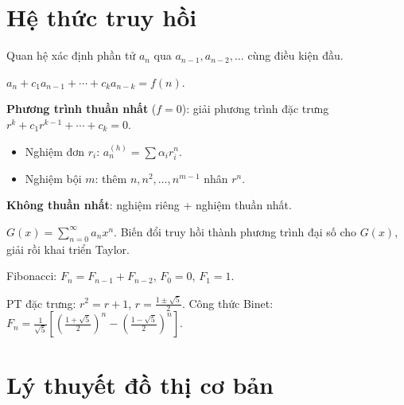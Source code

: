 \documentclass[12pt,a4paper]{article}
\begin{document}
\section{Hệ thức truy hồi}

\begin{dinhnghia}
  Quan hệ xác định phần tử $a_n$ qua $a_{n-1}, a_{n-2}, \ldots$ cùng điều kiện đầu.
\end{dinhnghia}

\begin{phuongphap}[title={Truy hồi tuyến tính hệ số hằng}]
  $a_n + c_1 a_{n-1} + \cdots + c_k a_{n-k} = f(n)$.

  \textbf{Phương trình thuần nhất} ($f = 0$): giải phương trình đặc trưng $r^k + c_1 r^{k-1} + \cdots + c_k = 0$.
  \begin{itemize}
    \item Nghiệm đơn $r_i$: $a_n^{(h)} = \sum \alpha_i r_i^n$.
    \item Nghiệm bội $m$: thêm $n, n^2, \ldots, n^{m-1}$ nhân $r^n$.
  \end{itemize}
  \textbf{Không thuần nhất}: nghiệm riêng + nghiệm thuần nhất.
\end{phuongphap}

\begin{phuongphap}[title={Hàm sinh (generating function)}]
  $G(x) = \sum_{n=0}^{\infty} a_n x^n$. Biến đổi truy hồi thành phương trình đại số cho $G(x)$, giải rồi khai triển Taylor.
\end{phuongphap}

\begin{vidu}
  Fibonacci: $F_n = F_{n-1} + F_{n-2}$, $F_0 = 0$, $F_1 = 1$.

  PT đặc trưng: $r^2 = r + 1$, $r = \frac{1 \pm \sqrt{5}}{2}$. Công thức Binet:
  $F_n = \frac{1}{\sqrt{5}}\left[\left(\frac{1+\sqrt{5}}{2}\right)^n - \left(\frac{1-\sqrt{5}}{2}\right)^n\right]$.
\end{vidu}

\section{Lý thuyết đồ thị cơ bản}
\end{document}
